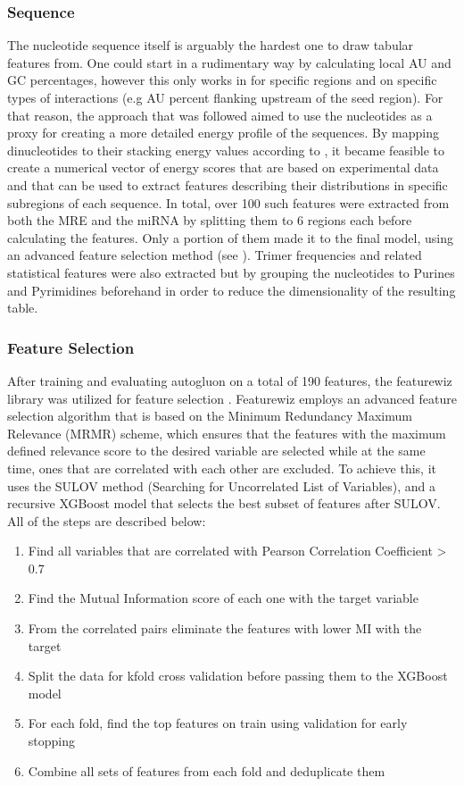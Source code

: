 \documentclass[en,ack]{dimscthesis}
\begin{document}
\subsubsection*{Sequence}
The nucleotide sequence itself is arguably the hardest one to draw tabular features from. One could start in a rudimentary way by calculating local AU and GC percentages, however this only works in for specific regions and on specific types of interactions (e.g AU percent flanking upstream of the seed region). For that reason, the approach that was followed aimed to use the nucleotides as a proxy for creating a more detailed energy profile of the sequences. By mapping dinucleotides to their stacking energy values according to \cite{turnerNNDBNearestNeighbor2010}, it became feasible to create a numerical vector of energy scores that are based on experimental data and that can be used to extract features describing their distributions in specific subregions of each sequence. In total, over 100 such features were extracted from both the MRE and the miRNA by splitting them to 6 regions each before calculating the features. Only a portion of them made it to the final model, using an advanced feature selection method (see ). Trimer frequencies and related statistical features were also extracted but by grouping the nucleotides to Purines and Pyrimidines beforehand in order to reduce the dimensionality of the resulting table.

\subsubsection*{Feature Selection}
\label{subsec:Feature Selection}
After training and evaluating autogluon on a total of 190 features, the featurewiz library was utilized for feature selection \parencite{seshadriAutoViMLFeaturewizUse2020}. Featurewiz employs an advanced feature selection algorithm that is based on the Minimum Redundancy Maximum Relevance (MRMR) scheme, which ensures that the features with the maximum defined relevance score to the desired variable are selected while at the same time, ones that are correlated with each other are excluded. To achieve this, it uses the SULOV method (Searching for Uncorrelated List of Variables), and a recursive XGBoost model that selects the best subset of features after SULOV. All of the steps are described below: 
\begin{enumerate}
	\item Find all variables that are correlated with Pearson Correlation Coefficient > 0.7
	\item Find the Mutual Information score of each one with the target variable
	\item From the correlated pairs eliminate the features with lower MI with the target
	\item Split the data for kfold cross validation before passing them to the XGBoost model
	\item For each fold, find the top features on train using validation for early stopping
	\item Combine all sets of features from each fold and deduplicate them
\end{enumerate}
\end{document}
